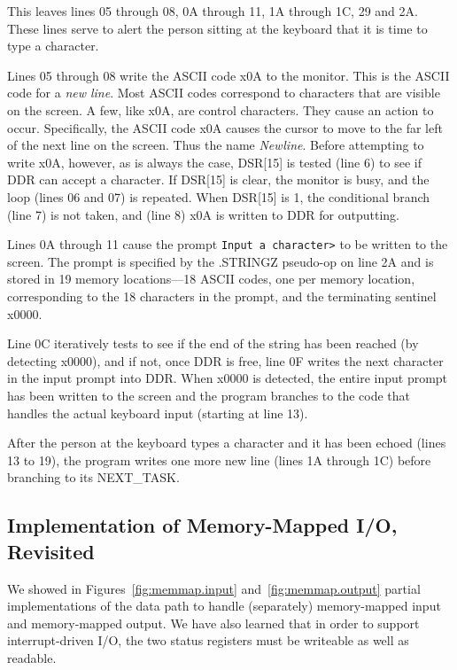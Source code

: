 \documentclass{patt}
\begin{document}
This leaves lines 05 through 08, 0A through 11, 1A through 1C, 29 and
2A.  These lines serve to alert the person sitting at the keyboard
that it is time to type a character.

Lines 05 through 08 write the ASCII code x0A to the monitor.  This is
the ASCII code for a {\em new line}.  Most ASCII codes correspond to
characters that are visible on the screen.  A few, like x0A, are
control characters.  They cause an action to occur. Specifically, the
ASCII code x0A causes the cursor to move to the far left of the next
line on the screen.  Thus the name {\em Newline}.  Before attempting
to write x0A, however, as is always the case, DSR[15] is tested (line
6) to see if DDR can accept a character.  If DSR[15] is clear, the
monitor is busy, and the loop (lines 06 and 07) is repeated.  When
DSR[15] is 1, the conditional branch (line 7) is not taken, and (line 8)
x0A is written to DDR for outputting.

Lines 0A through 11 cause the prompt
\verb|Input a character>|
to be written to the screen.  The prompt is specified by the
  .STRINGZ pseudo-op on line 2A and is stored in 19 memory
locations---18 ASCII codes, one per memory location, corresponding to
the 18 characters in the prompt, and the terminating sentinel x0000.

Line 0C iteratively tests to see if the end of the string has been
reached (by detecting x0000), and if not, once DDR is free, line 0F
writes the next character in the input prompt into DDR.  When x0000 is
detected, the entire input prompt has been written to the screen and 
the program branches to the code that handles the actual keyboard input 
(starting at line 13).

After the person at the keyboard types a character and it has been
echoed (lines 13 to 19), the program writes one more new line (lines
1A through 1C) before branching to its NEXT\_TASK.

\FloatBarrier
\subsection{Implementation of Memory-Mapped I/O, Revisited}

We showed in Figures~\ref{fig:memmap.input}
and~\ref{fig:memmap.output} partial implementations of the data path
to handle (separately) memory-mapped input and memory-mapped output.
We have also learned that in order to support interrupt-driven I/O,
the two status registers must be writeable as well as readable.
\end{document}

